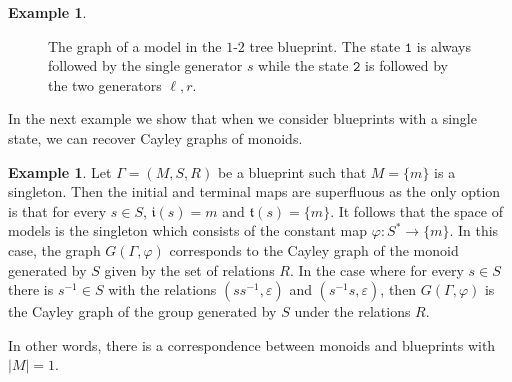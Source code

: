\documentclass{article}
\theoremstyle{definition}
\newtheorem{example}[theorem]{Example} %
\theoremstyle{definition}
\newcommand{\init}{\mathfrak{i}}
\newcommand{\ter}{\mathfrak{t}}
\begin{document}
\begin{example}
\begin{figure}[ht!]
		\caption{The graph of a model in the $1$-$2$ tree blueprint. The state $\texttt{1}$ is always followed by the single generator $s$ while the state $\texttt{2}$ is followed by the two generators $\ell,r$.}
		\label{fig:123-model}
	\end{figure}
\end{example}

In the next example we show that when we consider blueprints with a single state, we can recover Cayley graphs of monoids.

\begin{example}\label{ex:monoide_y_grupo}
    Let $\Gamma = (M,S,R)$ be a blueprint such that $M = \{m\}$ is a singleton. Then the initial and terminal maps are superfluous as the only option is that for every $s \in S$, $\init(s)=m$ and $\ter(s)=\{m\}$. It follows that the space of models is the singleton which consists of the constant map $\varphi\colon S^* \to \{m\}$. In this case, the graph $G(\Gamma, \varphi)$ corresponds to the Cayley graph of the monoid generated by $S$ given by the set of relations $R$. In the case where for every $s \in S$ there is $s^{-1}\in S$ with the relations $(ss^{-1},\varepsilon)$ and $(s^{-1}s,\varepsilon)$, then $G(\Gamma, \varphi)$ is the Cayley graph of the group generated by $S$ under the relations $R$.

    In other words, there is a correspondence between monoids and blueprints with $|M|=1$.
\end{example}
\end{document}
